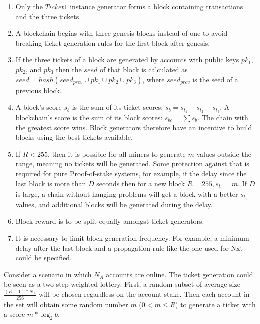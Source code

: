 \documentclass[preprint,review,3p,times,twocolumn]{elsarticle}
\begin{document}
\begin{enumerate}
\item Only the \(Ticket1\) instance generator forms a block containing transactions and the three tickets.

\item A blockchain begins with three genesis blocks instead of one to avoid breaking ticket generation rules for the first block after genesis. 

\item If the three tickets of a block are generated by accounts with public keys \(pk_{1}\), \(pk_{2}\), and \(pk_{3}\) then the \(seed\) of that block is calculated as \(seed = hash(seed_{prev} \cup pk_{1} \cup pk_{2} \cup pk_{3})\), where \(seed_{prev}\) is the seed of a previous block.	

\item A block's score \(s_b\) is the sum of its ticket scores: \(s_b = s_{t_1} + s_{t_2} + s_{t_3}\). A blockchain's score is the sum of its block scores: \(s_{bc}=\sum{s_b}\). The chain with the greatest score wins. Block generators therefore have an incentive to build blocks using the best tickets available.

\item If \(R < 255 \), then it is possible for all miners to generate \(m\) values outside the range, meaning no tickets will be generated. Some protection against that is required for pure Proof-of-stake systems, for example, if the delay since the last block is more than \(D\) seconds then for a new block \(R = 255, s_{t_i} = m\). If \(D\) is large, a chain without hanging problems will get a block with a better \(s_{t_i}\) values, and additional blocks will be generated during the delay.

\item Block reward is to be split equally amongst ticket generators.

\item It is necessary to limit block generation frequency. For example, a minimum delay after the last block and a propagation rule like the one used for Nxt could be specified. 

\end{enumerate}

Consider a scenario in which \(N_A\) accounts are online. The ticket generation could be seen as a two-step weighted lottery. First, a random subset of average size \(\frac{(R-1)*N_A}{256}\) will be chosen regardless on the account stake. Then each account in the set will obtain some random number \(m\) (\(0 < m \leqslant R\)) to generate a ticket with a score \(m * \log _2 b\). 
\end{document}
